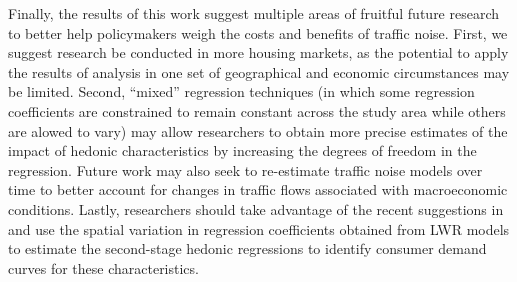 \documentclass{article}\usepackage{graphicx, color}
\begin{document}
Finally, the results of this work suggest multiple areas of fruitful future research to better help policymakers weigh the costs and benefits of traffic noise. First, we suggest research be conducted in more housing markets, as the potential to apply the results of analysis in one set of geographical and economic circumstances may be limited. Second, ``mixed'' regression techniques (in which some regression coefficients are constrained to remain constant across the study area while others are alowed to vary) may allow researchers to obtain more precise estimates of the impact of hedonic characteristics by increasing the degrees of freedom in the regression. Future work may also seek to re-estimate traffic noise models over time to better account for changes in traffic flows associated with macroeconomic conditions. Lastly, researchers should take advantage of the recent suggestions in \citet{Carruthers2010} and use the spatial variation in regression coefficients obtained from LWR models to estimate the second-stage hedonic regressions to identify consumer demand curves for these characteristics.

\begin{singlespace}


\end{singlespace}
\end{document}
